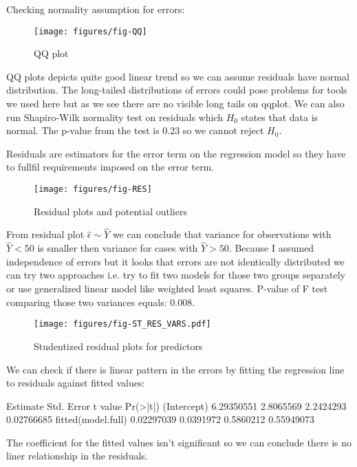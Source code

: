\documentclass[a4paper]{article}
\begin{document}
Checking normality assumption for errors:
\begin{figure}[H]
\begin{center}
\texttt{[image: figures/fig-QQ]}
\caption{QQ plot}
\end{center}
\end{figure}
QQ plots depicts quite good linear trend so we can assume residuals have normal
distribution. The long-tailed distributions of errors could pose problems for
tools we used here but as we see there are no visible long tails on qqplot.
We can also run Shapiro-Wilk normality test on residuals which $H_0$ states that
data is normal. The p-value from the test is
0.23 so we cannot reject
$H_0$.
  
Residuals are estimators for the error term on the regression model so they have
to fullfil requirements imposed on the error term. 
\begin{figure}[H]
\advance\rightskip-0.5cm
\advance\leftskip-1cm
\begin{center}
\texttt{[image: figures/fig-RES]}
\caption{Residual plots and potential outliers}
\label{RES_PLOT}
\end{center}
\end{figure}
From residual plot $\hat{\epsilon} \sim \hat{Y}$ we can conclude that variance
for observations with $\hat{Y}<50$ is smaller then variance for cases with
$\hat{Y}>50$. Because I assumed independence of errors but it looks that errors
are not identically distributed we can try two approaches i.e. try to fit two
models for those two groups separately or use generalized linear model like
weighted least squares.
P-value of F test comparing those two variances equals:
0.008.

\begin{figure}[H]
\begin{center}
\advance\rightskip-0.5cm
\advance\leftskip-1cm
\texttt{[image: figures/fig-ST\_RES\_VARS.pdf]}
\caption{Studentized residual plots for predictors}
\label{ST_RES_VARS_PLOT}
\end{center}
\end{figure}
 
We can check if there is linear pattern in the errors by fitting the regression
line to residuals against fitted values:
\begin{Schunk}
\begin{Soutput}
                     Estimate Std. Error   t value   Pr(>|t|)
(Intercept)        6.29350551  2.8065569 2.2424293 0.02766685
fitted(model.full) 0.02297039  0.0391972 0.5860212 0.55949073
\end{Soutput}
\end{Schunk}
The coefficient for the fitted values isn't significant so we can conclude
there is no liner relationship in the residuals.
\end{document}
